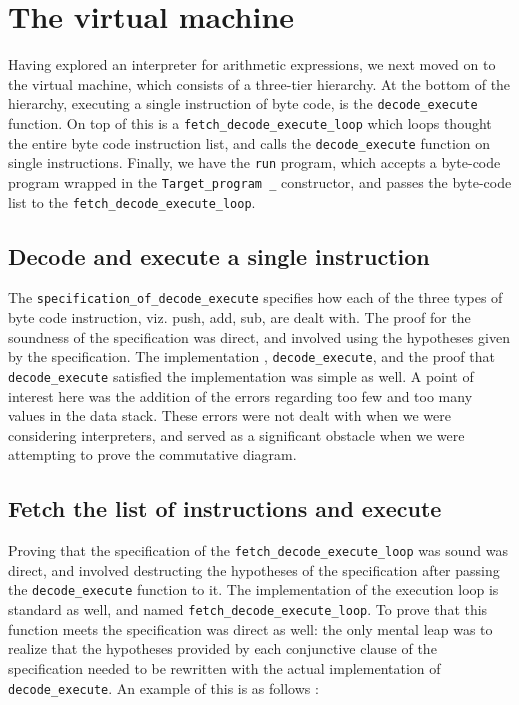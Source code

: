 \documentclass[12pt, a4paper]{article}
\begin{document}
\section{The virtual machine}
Having explored an interpreter for arithmetic expressions, we next moved on to the 
virtual machine, which consists of a three-tier hierarchy. At the bottom of the
hierarchy, executing a single instruction of byte code, is the \verb-decode_execute- function. On top of this is a \verb-fetch_decode_execute_loop- which loops
thought the entire byte code instruction list, and calls the \verb-decode_execute-
function on single instructions. Finally, we have the \verb-run- program, which
accepts a byte-code program wrapped in the \verb-Target_program _- constructor, 
and passes the byte-code list to the \verb-fetch_decode_execute_loop-.

\subsection {Decode and execute a single instruction}
The \verb-specification_of_decode_execute- specifies how each of the three types of 
byte code instruction, viz. push, add, sub, are dealt with. The proof for the
soundness of the specification was direct,  and involved using the hypotheses
given by the specification. The implementation
, \verb-decode_execute-, and the
proof that \verb-decode_execute- satisfied the implementation was simple as well.
A point of interest here was the addition of the errors regarding too few and too many
values in the data stack. These errors were not dealt with when we were considering 
interpreters, and served as a significant obstacle when we were attempting to prove
the commutative diagram. 

\subsection {Fetch the list of instructions and execute}
Proving that the specification of the \verb-fetch_decode_execute_loop- was sound
was direct, and involved destructing the hypotheses of the specification after passing
the \verb-decode_execute- function to it. The implementation of the execution loop is
standard as well, and named \verb-fetch_decode_execute_loop-. To prove that
this function meets the specification was direct as well: the only mental leap
was to realize that the hypotheses provided by each conjunctive clause of
the specification needed to be rewritten with the actual implementation of
\verb-decode_execute-. An example of this is as follows :
\end{document}
